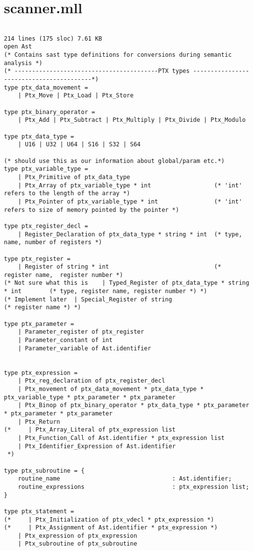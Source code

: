 \section{scanner.mll}
\begin{verbatim}

214 lines (175 sloc) 7.61 KB
open Ast
(* Contains sast type definitions for conversions during semantic analysis *)
(* -----------------------------------------PTX types -----------------------------------------*)
type ptx_data_movement = 
	| Ptx_Move | Ptx_Load | Ptx_Store

type ptx_binary_operator =
    | Ptx_Add | Ptx_Subtract | Ptx_Multiply | Ptx_Divide | Ptx_Modulo

type ptx_data_type =
	| U16 | U32 | U64 | S16 | S32 | S64

(* should use this as our information about global/param etc.*)
type ptx_variable_type = 
	| Ptx_Primitive of ptx_data_type
	| Ptx_Array of ptx_variable_type * int 					(* 'int' refers to the length of the array *)
	| Ptx_Pointer of ptx_variable_type * int 				(* 'int' refers to size of memory pointed by the pointer *)

type ptx_register_decl = 
	| Register_Declaration of ptx_data_type * string * int 	(* type, name, number of registers *)

type ptx_register = 
	| Register of string * int 								(* register name,  register number *)
(* Not sure what this is	| Typed_Register of ptx_data_type * string * int 		(* type, register name, register number *) *)
(* Implement later	| Special_Register of string 							(* register name *) *)

type ptx_parameter = 
	| Parameter_register of ptx_register
	| Parameter_constant of int 
	| Parameter_variable of Ast.identifier


type ptx_expression =
	| Ptx_reg_declaration of ptx_register_decl
	| Ptx_movement of ptx_data_movement * ptx_data_type * ptx_variable_type * ptx_parameter * ptx_parameter
	| Ptx_Binop of ptx_binary_operator * ptx_data_type * ptx_parameter * ptx_parameter * ptx_parameter
	| Ptx_Return
(*     | Ptx_Array_Literal of ptx_expression list 
	| Ptx_Function_Call of Ast.identifier * ptx_expression list
	| Ptx_Identifier_Expression of Ast.identifier
 *)

type ptx_subroutine = {
	routine_name								: Ast.identifier;
	routine_expressions							: ptx_expression list;
}

type ptx_statement = 
(*     | Ptx_Initialization of ptx_vdecl * ptx_expression *)
(*     | Ptx_Assignment of Ast.identifier * ptx_expression *)
    | Ptx_expression of ptx_expression
    | Ptx_subroutine of ptx_subroutine


\end{verbatim}
